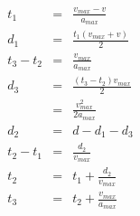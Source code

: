 \begin{eqnarray*}
t_1 & = & \frac{v_{max} - v}{a_{max}} \\
d_1 & = & \frac{t_1 (v_{max} + v)}{2} \\
t_3 - t_2 & = & \frac{v_{max}}{a_{max}} \\
d_3 & = & \frac{(t_3 - t_2) v_{max}}{2} \\
& = & \frac{v_{max}^2}{2 a_{max}} \\
d_2 & = & d - d_1 - d_3 \\
t_2 - t_1 & = & \frac{d_2}{v_{max}} \\
t_2 & = & t_1 + \frac{d_2}{v_{max}} \\
t_3 & = & t_2 + \frac{v_{max}}{a_{max}}
\end{eqnarray*}
